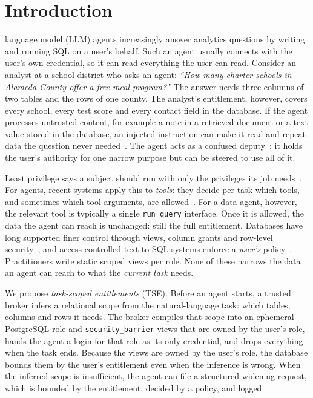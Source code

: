 \section{Introduction}
\label{sec:introduction}

 language model (LLM) agents increasingly answer analytics questions by writing and running SQL on
a user's behalf. Such an agent usually connects with the user's own credential, so it can read everything the user
can read. Consider an analyst at a school district who asks an agent: \emph{``How many charter schools in Alameda
County offer a free-meal program?''} The answer needs three columns of two tables and the rows of one county. The
analyst's entitlement, however, covers every school, every test score and every contact field in the database. If the
agent processes untrusted content, for example a note in a retrieved document or a text value stored in the
database, an injected instruction can make it read and repeat data the question never needed~\cite{greshake2023not,debenedetti2024agentdojo}.
The agent acts as a confused deputy~\cite{hardy1988confused}: it holds the user's authority for one narrow purpose but
can be steered to use all of it.

Least privilege says a subject should run with only the privileges its job needs~\cite{saltzer1975protection,dennis1966programming,nist80053r5}.
For agents, recent systems apply this to \emph{tools}: they decide per task which tools, and sometimes which tool
arguments, are allowed~\cite{zhu2025miniscope,shi2025progent,cai2025agentsentry,zhu2026igac,zheng2026intentcap}.
For a data agent, however, the relevant tool is typically a single \texttt{run\_query} interface. Once it is allowed,
the data the agent can reach is unchanged: still the full entitlement. Databases have long supported finer control
through views, column grants and row-level security~\cite{stonebraker1975query,rizvi2004extending,pgrls,oraclevpd},
and access-controlled text-to-SQL systems enforce a \emph{user's} policy~\cite{fei2026rbac,klisura2026role,miyamoto2026pccsql,kim2026securemcp}.
Practitioners write static scoped views per role. None of these narrows the data an agent can reach to what the
\emph{current task} needs.

We propose \emph{task-scoped entitlements} (TSE). Before an agent starts, a trusted broker infers a relational scope
from the natural-language task: which tables, columns and rows it needs. The broker compiles that scope into an
ephemeral PostgreSQL role and \texttt{security\_barrier} views that are owned by the user's role, hands the agent a
login for that role as its only credential, and drops everything when the task ends. Because the views are owned by
the user's role, the database bounds them by the user's entitlement even when the inference is wrong. When the
inferred scope is insufficient, the agent can file a structured widening request, which is bounded by the
entitlement, decided by a policy, and logged.


